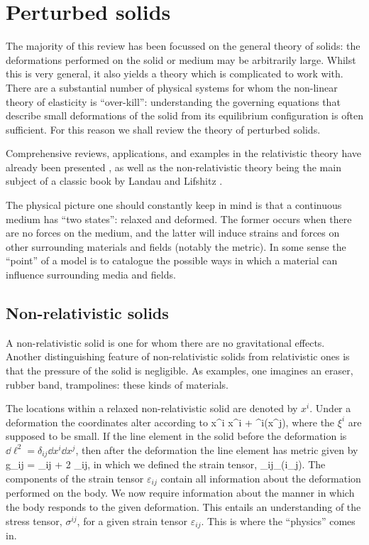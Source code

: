 \section{Perturbed solids}
The majority of this review has been focussed on the general theory of solids: the deformations performed on the solid or medium may be arbitrarily large. Whilst this is very general, it also yields a theory which is complicated to work with. There are a substantial number of physical systems for whom the non-linear theory of elasticity is ``over-kill'': understanding the governing equations that describe small deformations of the solid from its equilibrium configuration is often sufficient. For this reason we shall review the theory of perturbed solids.

Comprehensive reviews, applications, and examples in the relativistic theory have already been presented \cite{Carter:1973zz, Carter:1977qf, Bucher:1998mh, Battye:2005ik, Battye:2007aa, Battye:2013er, Pearson:2014iaa}, as well as the non-relativistic theory being the main subject of a classic book by Landau and Lifshitz \cite{ll_elast}.

The physical picture one should constantly keep in mind is that a continuous medium has ``two states'': relaxed and deformed. The former occurs when there are no forces on the medium, and the latter will induce strains and forces on other surrounding materials and fields (notably the metric). In some sense the ``point'' of a model is to catalogue the possible ways in which a material can influence surrounding media and fields. 



\subsection{Non-relativistic solids}
A non-relativistic solid is one for whom there are no gravitational effects. Another distinguishing feature of non-relativistic solids from relativistic ones is that the pressure of the solid is negligible.  As examples, one imagines an eraser, rubber band, trampolines: these kinds of materials. 

The locations within a relaxed non-relativistic solid are denoted by $x^i$. Under a deformation the coordinates alter according to 
\bea
x^i \longrightarrow x^i + \xi^i(x^j),
\eea
where the $\xi^i$ are supposed to be small.
 If the line element in the solid before the deformation is $\dd\ell^2 = \delta_{ij} \dd x^i \dd x^j$, then after the deformation the line element has metric  given by
\bea
g_{ij} = \delta_{ij} + 2 \varepsilon_{ij},
\eea
in which we defined the strain tensor,
\bea
\label{non-rel-strain-defn}
\varepsilon_{ij} \partial_{(i}\xi_{j)}.
\eea
The components of the strain tensor $\varepsilon_{ij}$ contain all information about the deformation performed on the body. We now require information about the manner in which the body responds to the given deformation. This   entails   an understanding of the stress tensor, $\sigma^{ij}$, for a given strain tensor $\varepsilon_{ij}$. This is where the ``physics'' comes in.

